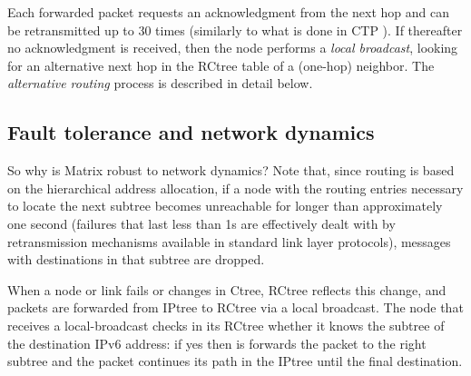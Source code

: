 Each forwarded packet requests an acknowledgment from the next hop and can be
retransmitted up to 30 times (similarly to what is done in CTP
\cite{Fonseca:2009}). If thereafter no acknowledgment
is received, then the node performs a \textit{local broadcast}, looking for an
alternative next hop in the RCtree table of a (one-hop) neighbor. The
\textit{alternative routing} process is described in detail below.

\subsection{Fault tolerance and network dynamics}

So why is Matrix robust to network dynamics? Note that, since
routing is based on the hierarchical address allocation, if a node
with the routing entries necessary to locate the next subtree
becomes unreachable for longer than approximately one second
(failures that last less than 1s are effectively dealt with by
retransmission mechanisms available in standard link layer
protocols), messages with destinations in that subtree are dropped.

When a node or link fails or changes in Ctree, RCtree reflects this
change, and packets are forwarded from IPtree to RCtree via a local
broadcast. The node that receives a local-broadcast checks in its
RCtree whether it knows the subtree of the destination IPv6 address:
if yes then is forwards the packet to the right subtree and the
packet continues its path in the IPtree until the final destination.

